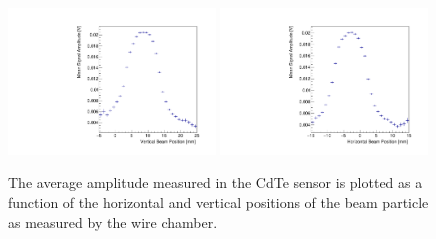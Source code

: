 \begin{figure}[htbp] 
\centering
\includegraphics[width=0.49\textwidth]{figures/SensorXProfile.pdf} 
\includegraphics[width=0.49\textwidth]{figures/SensorYProfile.pdf} 
\caption{The average amplitude measured in the CdTe sensor is plotted as a function of 
the horizontal and vertical positions of the beam particle as measured by the wire chamber.} 
\label{fig:BeamSensorPosition} 
\end{figure} 

